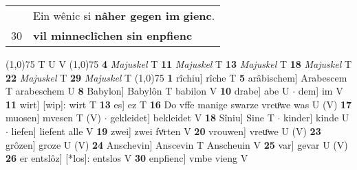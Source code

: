\documentclass[8pt,a4paper,notitlepage]{article}
\begin{document}
\begin{table}[ht]
\begin{minipage}[t]{0.5\linewidth}
\begin{tabular}{rl}
 & Ein wênic si \textbf{nâher gegen im} \textbf{gienc}.\\ 
30 & \textbf{vil minneclîchen sin enpfienc}\\ 
\end{tabular}
\scriptsize
\line(1,0){75} \newline
T U V \newline
\line(1,0){75} \newline
\textbf{4} \textit{Majuskel} T  \textbf{11} \textit{Majuskel} T  \textbf{13} \textit{Majuskel} T  \textbf{18} \textit{Majuskel} T  \textbf{22} \textit{Majuskel} T  \textbf{29} \textit{Majuskel} T  \newline
\line(1,0){75} \newline
\textbf{1} rîchiu] rîche T \textbf{5} arâbischem] Arabescem T arabeschem U \textbf{8} Babylon] Babylôn T babilon V \textbf{10} drabe] abe U  $\cdot$ dem] im V \textbf{11} wirt] [wip]: wirt T \textbf{13} es] ez T \textbf{16} Do vffe manige swarze vreuͦwe was U (V) \textbf{17} muosen] mvesen T (V)  $\cdot$ gekleidet] bekleidet V \textbf{18} Sîniu] Sine T  $\cdot$ kinder] kinde U  $\cdot$ liefen] liefent alle V \textbf{19} zwei] zwei fvͦrten V \textbf{20} vrouwen] vreuͦwe U (V) \textbf{23} grôzen] groze U (V) \textbf{24} Anschevin] Anscevin T Anscheuin V \textbf{25} var] gevar U (V) \textbf{26} er entslôz] [*los]: entslos V \textbf{30} enpfienc] vmbe vieng V \newline
\end{minipage}
\end{table}
\end{document}
